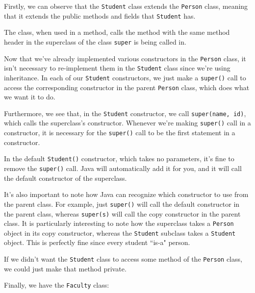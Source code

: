 Firstly, we can observe that the \verb!Student! class extends the \verb!Person! class, meaning that it extends the public methods and fields that \verb!Student! has. 

The  class, when used in a method, calls the method with the same method header in the superclass of the class \verb!super! is being called in. 

Now that we've already implemented various constructors in the \verb!Person! class, it isn't necessary to re-implement them in the \verb!Student! class since we're using inheritance. In each of our \verb!Student! constructors, we just make a \verb!super()! call to access the corresponding constructor in the parent \verb!Person! class, which does what we want it to do.

Furthermore, we see that, in the \verb!Student! constructor, we call \verb!super(name, id)!, which calls the superclass's constructor. Whenever we're making \verb!super()! call in a constructor, it is necessary for the \verb!super()! call to be the first statement in a constructor. 


In the default \verb!Student()! constructor, which takes no parameters, it's fine to remove the \verb!super()! call. Java will automatically add it for you, and it will call the default constructor of the superclass. 


It's also important to note how Java can recognize which constructor to use from the parent class. For example, just \verb!super()! will call the default constructor in the parent class, whereas \verb!super(s)! will call the copy constructor in the parent class. It is particularly interesting to note how the superclass takes a \verb!Person! object in its copy constructor, whereas the \verb!Student! subclass takes a \verb!Student! object. This is perfectly fine since every student ``is-a" person. 


If we didn't want the \verb!Student! class to access some method of the \verb!Person! class, we could just make that method private.



Finally, we have the \verb!Faculty! class:


